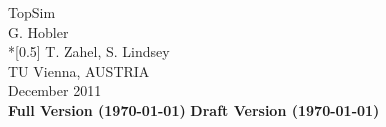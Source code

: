 %
\begin{center}
{
\vspace*{4cm}
%
\titlefont
TopSim \\ \vspace*{3cm}
%
\authorfont
G. Hobler\\*[0.5\baselineskip] 
T. Zahel, S. Lindsey \\ \vspace*{1ex}
}
\vspace*{2.5cm}
%
TU Vienna, AUSTRIA \\ \vspace*{1ex}
December 2011 \\ \vspace*{4cm}
%
\ifprivate
   {\bf Full Version (\today)}
\else
   {\bf Draft Version (\today)}
\fi
%
\end{center}
